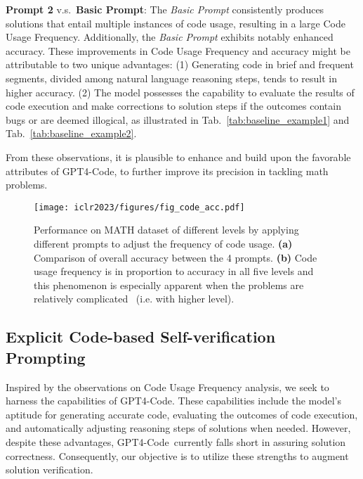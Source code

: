 \documentclass{article} \usepackage{iclr2023_conference,times}
\newcommand{\gptcode}{GPT4-Code}
\begin{document}
\textbf{Prompt 2} v.s.~\textbf{Basic Prompt}: The \textit{Basic Prompt} consistently produces solutions that entail multiple instances of code usage, resulting in a large Code Usage Frequency. Additionally, the \textit{Basic Prompt} exhibits notably enhanced accuracy. These improvements in Code Usage Frequency and accuracy might be attributable to two unique advantages: (1) Generating code in brief and frequent segments, divided among natural language reasoning steps, tends to result in higher accuracy. (2) The model possesses the capability to evaluate the results of code execution and make corrections to solution steps if the outcomes contain bugs or are deemed illogical, as illustrated in Tab.~\ref{tab:baseline_example1} and Tab.~\ref{tab:baseline_example2}.

From these observations, it is plausible to enhance and build upon the favorable attributes of \gptcode,  to further improve its precision in tackling math problems.

\begin{figure}[t]
\begin{center}
\texttt{[image: iclr2023/figures/fig\_code\_acc.pdf]}

\end{center}
\vspace{-7mm}
\caption{\small
Performance on MATH dataset of different levels by applying different prompts to adjust the frequency of code usage. \textbf{(a)} Comparison of overall accuracy between the 4 prompts. \textbf{(b)} Code usage frequency is in proportion to accuracy in all five levels and this phenomenon is especially apparent when the problems are relatively complicated ~(i.e. with higher level).
}
\label{fig:pilot_experiments}
\end{figure}

\subsection{Explicit Code-based Self-verification Prompting}
\label{proposed method}



Inspired by the observations on Code Usage Frequency analysis, we seek to harness the capabilities of \gptcode. These capabilities include the model's aptitude for generating accurate code, evaluating the outcomes of code execution, and automatically adjusting reasoning steps of solutions when needed. However, despite these advantages, \gptcode~currently falls short in assuring solution correctness. Consequently, our objective is to utilize these strengths to augment solution verification.
\end{document}
